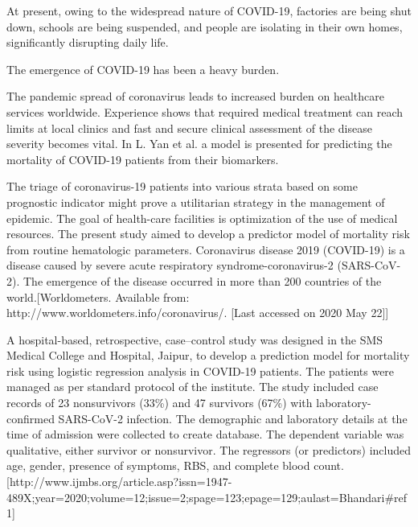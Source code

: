 At present, owing to the widespread nature of COVID-19, factories are being shut down, schools are being suspended, and people are isolating in their own homes, significantly disrupting daily life.

The emergence of COVID-19 has been a heavy burden.

The pandemic spread of coronavirus leads to increased burden on healthcare services worldwide. Experience shows that required medical treatment can reach limits at local clinics and fast and secure clinical assessment of the disease severity becomes vital. In L. Yan et al. a model is presented for predicting the mortality of COVID-19 patients from their biomarkers. 

The triage of coronavirus-19 patients into various strata based on some prognostic indicator might prove a utilitarian strategy in the management of epidemic. The goal of health-care facilities is optimization of the use of medical resources. The present study aimed to develop a predictor model of mortality risk from routine hematologic parameters. 
Coronavirus disease 2019 (COVID-19) is a disease caused by severe acute respiratory syndrome-coronavirus-2 (SARS-CoV-2). The emergence of the disease occurred in more than 200 countries of the world.[Worldometers. Available from: http://www.worldometers.info/coronavirus/. [Last accessed on 2020 May 22]]

A hospital-based, retrospective, case–control study was designed in the SMS Medical College and Hospital, Jaipur, to develop a prediction model for mortality risk using logistic regression analysis in COVID-19 patients. The patients were managed as per standard protocol of the institute. The study included case records of 23 nonsurvivors (33\%) and 47 survivors (67\%) with laboratory-confirmed SARS-CoV-2 infection. The demographic and laboratory details at the time of admission were collected to create database. The dependent variable was qualitative, either survivor or nonsurvivor. The regressors (or predictors) included age, gender, presence of symptoms, RBS, and complete blood count.[http://www.ijmbs.org/article.asp?issn=1947-489X;year=2020;volume=12;issue=2;spage=123;epage=129;aulast=Bhandari#ref1]

